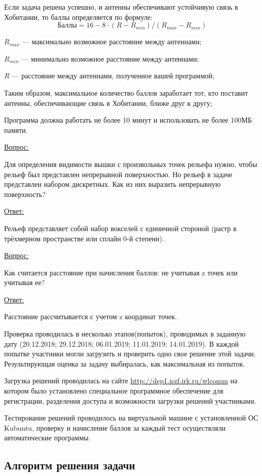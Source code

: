Если задача решена успешно, и антенны обеспечивают устойчивую связь в Хобитании, то баллы определяется по формуле:
$$\text{Баллы}=16-8 \cdot (R-R_{min})/(R_{max}-R_{min})$$

$R_{max}$ — максимально возможное расстояние между антеннами;

$R_{min}$ — минимально возможное расстояние между антеннами;

$R$ — расстояние между антеннами, полученное вашей программой;

Таким образом, максимальное количество баллов заработает тот, кто поставит антенны, обеспечивающие связь в Хобитании, ближе друг к другу;

Программа должна работать не более 10 минут и использовать не более 100МБ памяти.

\commentsSection

\underline{Вопрос:} 

Для определения видимости вышки с произвольных точек рельефа нужно, чтобы рельеф был представлен непрерывной поверхностью. Но рельеф в задаче представлен набором дискретных. Как из них выразить непрерывную поверхность?

\underline{Ответ:} 

Рельеф представляет собой набор вокселей с единичной стороной (растр в трёхмерном пространстве или сплайн 0-й степени).

\underline{Вопрос:} 

Как считается расстояние при начисления баллов: не учитывая z точек или учитывая ее?

\underline{Ответ:} 

Расстояние рассчитывается с учетом z координат точек.

Проверка проводилась в несколько этапов(попыток), проводимых в заданную дату (20.12.2018; 29.12.2018; 06.01.2019; 11.01.2019; 14.01.2019). В каждой попытке участники могли загрузить и проверить одно свое решение этой задачи.
Результирующая оценка за задачу выбиралась, как максимальная из попыток.

Загрузка решений проводилась на сайте \url{http://dep1.iszf.irk.ru/wlcomm} на котором было установлено специальное программное обеспечение для регистрации, разделения доступа и возможности загрузки решений участниками.

Тестирование решений проводилось на виртуальной машине с установленной ОС Kubuntu, проверку и начисление баллов за каждый тест осуществляли автоматические программы.

\subsection*{Алгоритм решения задачи}

